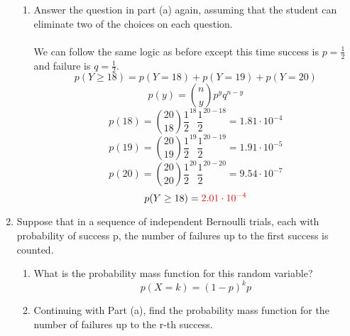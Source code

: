 \documentclass{article}
\begin{document}
\begin{enumerate}
\begin{enumerate}
            \item Answer the question in part (a) again, assuming that the student can eliminate
two of the choices on each question.\\\\
                We can follow the same logic as before except this time success is $p=\frac{1}{2}$ and failure is $q=\frac{1}{2}$.
                \begin{equation*}
                    p(Y\geq 18) = p(Y=18)+p(Y=19)+p(Y=20)
                \end{equation*}
                \begin{equation*}
                    p(y)=\binom{n}{y}p^yq^{n-y}
                \end{equation*}
                \begin{equation*}
                    p(18)=\binom{20}{18}\frac{1}{2}^{18}\frac{1}{2}^{20-18}=1.81\cdot10^{-4}
                \end{equation*}
                \begin{equation*}
                    p(19)=\binom{20}{19}\frac{1}{2}^{19}\frac{1}{2}^{20-19}=1.91\cdot10^{-5}
                \end{equation*}
                \begin{equation*}
                    p(20)=\binom{20}{20}\frac{1}{2}^{20}\frac{1}{2}^{20-20}=9.54\cdot10^{-7}
                \end{equation*}
                \begin{equation*}
                    p(Y\geq 18) = \textcolor{red}{2.01\cdot10^{-4}}
                \end{equation*}
        \end{enumerate}
\pagebreak
        \item Suppose that in a sequence of independent Bernoulli trials, each with probability
of success p, the number of failures up to the first success is counted. 
        \begin{enumerate}
            \item What is the probability mass function for this random variable?
            \begin{equation*}
                p(X=k)=(1-p)^kp
            \end{equation*}
            \item Continuing with Part (a), find the probability mass function for the number of failures up to the r-th success.
            \begin{equation*}

\end{equation*}
\end{enumerate}
\end{enumerate}
\end{document}
